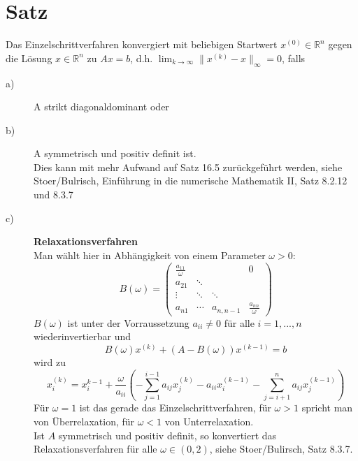 \documentclass{scrbook}
\begin{document}
\section{Satz} Das Einzelschrittverfahren konvergiert mit beliebigen Startwert $x^{(0)} \in \mathbb{R}^n $ gegen die Lösung $x \in \mathbb{R}^n$ zu $Ax=b$, d.h. $\lim_{k \to \infty}\| x^{(k)} - x \|_\infty = 0$, falls
\begin{description}
\item[a)] A strikt diagonaldominant oder
\item[b)] A symmetrisch und positiv definit ist.\\
Dies kann mit mehr Aufwand auf Satz 16.5 zurückgeführt werden, siehe Stoer/Bulrisch, Einführung in die numerische Mathematik II, Satz 8.2.12 und 8.3.7
\item[c)] \textbf{Relaxationsverfahren}\\
Man wählt hier in Abhängigkeit von einem Parameter $\omega > 0$:
\[
B(\omega) =
\left(
\begin{array}{cccc}
\frac{a_{11}}{\omega}&&&0\\
a_{21}&\ddots\\
\vdots&\ddots&\ddots\\
a_{n1}&\cdots&a_{n,n-1}&\frac{a_{nn}}{\omega}
\end{array}
\right)
\]
$B(\omega)$ ist unter der Vorraussetzung $a_{ii} \neq 0$ für alle $i=1,..., n$ wiederinvertierbar und 
\[B(\omega)x^{(k)}+(A-B(\omega))x^{(k-1)} = b\]
wird zu
\[
x^{(k)}_i = x_i^{k-1} + \frac{\omega}{a_{ii}}\left(
-\sum_{j=1}^{i-1}a_{ij}x_j^{(k)}
-a_{ii}x_i^{(k-1)}
-\sum_{j=i+1}^n a_{ij} x_j^{(k-1)}
\right)
\]
Für $\omega=1$ ist das gerade das Einzelschrittverfahren, für $\omega > 1$ spricht man von Überrelaxation, für $\omega < 1$ von Unterrelaxation.\\
Ist $A$ symmetrisch und positiv definit, so konvertiert das Relaxationsverfahren für alle $\omega \in (0,2)$, siehe Stoer/Bulirsch, Satz 8.3.7.
\end{description}
\end{document}
